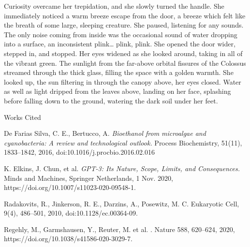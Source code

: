 \documentclass[12pt]{article}
\newcommand{\bibent}{\noindent \hangindent 40pt}
\newenvironment{workscited}{\newpage \begin{center} Works Cited \end{center}}{\newpage }
\begin{document}
\begin{flushleft}
Curiosity overcame her trepidation, and she slowly turned the handle. She immediately noticed a warm breeze escape from the door, a breeze which felt like the breath of some large, sleeping creature. She paused, listening for any sounds. The only noise coming from inside was the occasional sound of water dropping into a surface, an inconsistent plink…  plink, plink. She opened the door wider, stepped in, and stopped. Her eyes widened as she looked around, taking in all of the vibrant green. The sunlight from the far-above orbital fissures of the Colossus streamed through the thick glass, filling the space with a golden warmth. She looked up, the sun filtering in through the canopy above, her eyes closed. Water as well as light dripped from the leaves above, landing on her face, splashing before falling down to the ground, watering the dark soil under her feet. 
\newpage

\begin{workscited}

\bibent
De Farias Silva, C. E., Bertucco, A. \textit{Bioethanol from microalgae and cyanobacteria: A review and technological outlook.} Process Biochemistry, 51(11), 1833–1842, 2016, doi:10.1016/j.procbio.2016.02.016

\bibent
K. Elkins, J. Chun, et al. \textit{GPT-3: Its Nature, Scope, Limits, and Consequences.} Minds and Machines, Springer Netherlands, 1 Nov. 2020, https://doi.org/10.1007/s11023-020-09548-1.

\bibent
Radakovits, R., Jinkerson, R. E., Darzins, A., Posewitz, M. C.  Eukaryotic Cell, 9(4), 486–501, 2010, doi:10.1128/ec.00364-09.

\bibent
Regehly, M., Garmshausen, Y., Reuter, M. et al. . Nature 588, 620–624, 2020, https://doi.org/10.1038/s41586-020-3029-7.


\end{workscited}

\end{flushleft}
\end{document}

